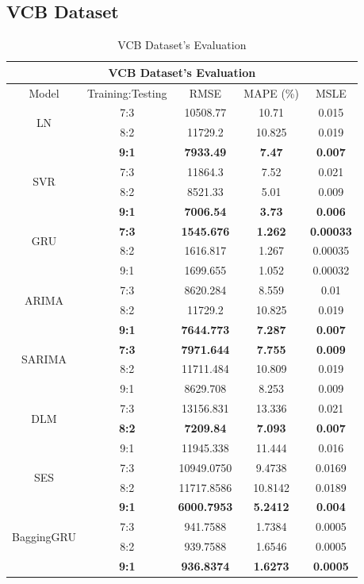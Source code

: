 \documentclass{ieeeojies}
\begin{document}
\subsection{VCB Dataset} 
\begin{table}[H]
    \centering
    \begin{tabular}{|c|c|c|c|c|}
         \hline
         \multicolumn{5}{|c|}{\textbf{VCB Dataset's Evaluation}}\\
         \hline
         \centering Model & Training:Testing & RMSE & MAPE (\%) & MSLE\\
         \hline
         \multirow{2}{*}{LN} & 7:3 & 10508.77 & 10.71 & 0.015 \\ & 8:2 & 11729.2 & 10.825 & 0.019 \\ & \textbf{9:1} & \textbf{7933.49} & \textbf{7.47} & \textbf{0.007}\\
         \hline
         \multirow{2}{*}{SVR} & 7:3&11864.3&7.52&0.021\\ & 8:2&8521.33&5.01&0.009 \\ & \textbf{9:1} & \textbf{7006.54} & \textbf{3.73} & \textbf{0.006}\\
         \hline
         \multirow{2}{*}{GRU} & \textbf{7:3}	& \textbf{1545.676} & \textbf{1.262} & \textbf{0.00033} \\ & 8:2 & 1616.817 & 1.267 & 0.00035 \\ & 9:1 & 1699.655  & 1.052 & 0.00032\\
         \hline
         \multirow{2}{*}{ARIMA} & 7:3 &  8620.284 &  8.559 & 0.01 \\ & 8:2 &  11729.2 & 10.825 & 0.019 \\ & \textbf{9:1} & \textbf{7644.773}  & \textbf{7.287} & \textbf{0.007}\\
         \hline
         \multirow{2}{*}{SARIMA} & \textbf{7:3}	& \textbf{7971.644} & \textbf{7.755} & \textbf{0.009} \\ & 8:2 & 11711.484 & 10.809 & 0.019 \\ & 9:1 & 8629.708 & 8.253 & 0.009\\
         \hline
         \multirow{2}{*}{DLM} & 7:3 & 13156.831&13.336 & 0.021 \\ & \textbf{8:2} &	\textbf{7209.84} & \textbf{7.093} & \textbf{0.007} \\ & 9:1 &11945.338	&11.444&0.016\\
         \hline
         \multirow{2}{*}{SES} & 7:3 & 10949.0750 & 9.4738 & 0.0169 \\ & 8:2 & 11717.8586 &10.8142 & 0.0189 \\ & \textbf{9:1} &  	\textbf{6000.7953} &	\textbf{5.2412} & 	\textbf{0.004} \\
         \hline
         \multirow{2}{*}{BaggingGRU} & 7:3 & 941.7588 &  1.7384 &  0.0005 \\ & 8:2 & 939.7588 &  1.6546 &  0.0005 \\ & \textbf{9:1} & \textbf{936.8374} & \textbf{1.6273} & \textbf{0.0005}\\
         \hline
    \end{tabular}
    \caption{VCB Dataset's Evaluation}
    \label{vcbresult}
\end{table}
\end{document}
